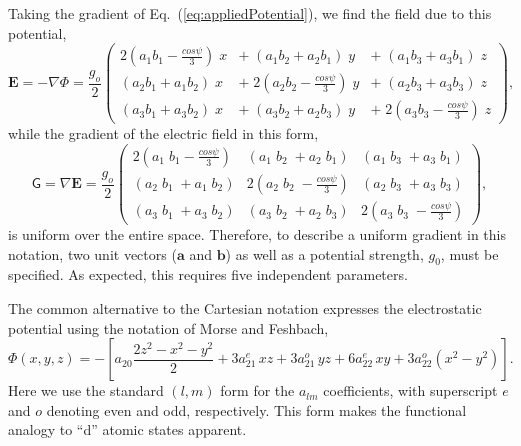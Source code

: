 Taking the gradient of Eq.~(\ref{eq:appliedPotential}), we find the
field due to this potential,
\begin{equation}
\mathbf{E} = -\nabla \Phi
=\frac{g_o}{2} \left(\begin{array}{ccc}
2(a_1 b_1 - \frac{cos\psi}{3})\; x & +\; (a_1 b_2 + a_2 b_1)\; y & +\; (a_1 b_3 + a_3 b_1)\; z \\
 (a_2 b_1 + a_1 b_2)\; x & +\; 2(a_2 b_2 - \frac{cos\psi}{3})\; y & +\;  (a_2 b_3 + a_3 b_3)\; z \\
(a_3 b_1 + a_3 b_2)\; x & +\;  (a_3 b_2 + a_2 b_3)\; y & +\; 2(a_3 b_3 - \frac{cos\psi}{3})\; z 
\end{array} \right),
\label{eq:CE}
\end{equation} 
while the gradient of the electric field in this form,
\begin{equation}
\mathsf{G} = \nabla\mathbf{E} 
= \frac{g_o}{2}\left(\begin{array}{ccc}
2(a_1\; b_1 - \frac{cos\psi}{3}) &  (a_1\; b_2 \;+ a_2\; b_1) & (a_1\; b_3 \;+ a_3\; b_1) \\
 (a_2\; b_1 \;+ a_1\; b_2) & 2(a_2\; b_2 \;- \frac{cos\psi}{3}) & (a_2\; b_3 \;+ a_3\; b_3) \\
(a_3\; b_1 \;+ a_3\; b_2) & (a_3\; b_2 \;+ a_2\; b_3) & 2(a_3\; b_3 \;- \frac{cos\psi}{3})
\end{array} \right),
\label{eq:GC}
\end{equation}  
is uniform over the entire space.  Therefore, to describe a uniform
gradient in this notation, two unit vectors ($\mathbf{a}$ and
$\mathbf{b}$) as well as a potential strength, $g_0$, must be
specified. As expected, this requires five independent parameters.

The common alternative to the Cartesian notation expresses the
electrostatic potential using the notation of Morse and
Feshbach,\cite{Morse:1946zr}
\begin{equation} \label{eq:quad_phi} 
\Phi(x,y,z) = -\left[ a_{20} \frac{2 z^2 -x^2 - y^2}{2}
+ 3 a_{21}^e \,xz + 3 a_{21}^o \,yz  
 + 6a_{22}^e \,xy +  3 a_{22}^o (x^2 - y^2) \right].
\end{equation}
Here we use the standard $(l,m)$ form for the $a_{lm}$ coefficients,
with superscript $e$ and $o$ denoting even and odd, respectively.
This form makes the functional analogy to ``d'' atomic states
apparent. 

